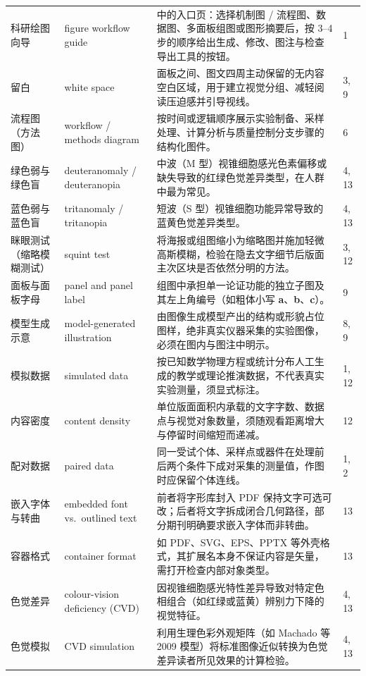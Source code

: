 \begin{longtable}{@{}p{26mm}p{32mm}p{54mm}p{8mm}@{}}
科研绘图向导 & figure workflow guide & \scidraw{} 中的入口页：选择机制图 / 流程图、数据图、多面板组图或图形摘要后，按 3–4 步的顺序给出生成、修改、图注与检查导出工具的按钮。 & 1 \\
留白 & white space & 面板之间、图文四周主动保留的无内容空白区域，用于建立视觉分组、减轻阅读压迫感并引导视线。 & 3, 9 \\
流程图（方法图） & workflow / methods diagram & 按时间或逻辑顺序展示实验制备、采样处理、计算分析与质量控制分支步骤的结构化图件。 & 6 \\
绿色弱与绿色盲 & deuteranomaly / deuteranopia & 中波（M 型）视锥细胞感光色素偏移或缺失导致的红绿色觉差异类型，在人群中最为常见。 & 4, 13 \\
蓝色弱与蓝色盲 & tritanomaly / tritanopia & 短波（S 型）视锥细胞功能异常导致的蓝黄色觉差异类型。 & 4, 13 \\
眯眼测试（缩略模糊测试） & squint test & 将海报或组图缩小为缩略图并施加轻微高斯模糊，检验在隐去文字细节后版面主次区块是否依然分明的方法。 & 3, 12 \\
面板与面板字母 & panel and panel label & 组图中承担单一论证功能的独立子图及其左上角编号（如粗体小写 \textbf{a}、\textbf{b}、\textbf{c}）。 & 9 \\
模型生成示意 & model-generated illustration & 由图像生成模型产出的结构或形貌占位图样，绝非真实仪器采集的实验图像，必须在图内与图注中明示。 & 8, 9 \\
模拟数据 & simulated data & 按已知数学物理方程或统计分布人工生成的教学或理论推演数据，不代表真实实验测量，须显式标注。 & 1, 12 \\
内容密度 & content density & 单位版面面积内承载的文字字数、数据点与视觉对象数量，须随观看距离增大与停留时间缩短而递减。 & 12 \\
配对数据 & paired data & 同一受试个体、采样点或器件在处理前后两个条件下成对采集的测量值，作图时应保留个体连线。 & 1, 2 \\
嵌入字体与转曲 & embedded font vs.\ outlined text & 前者将字形库封入 PDF 保持文字可选可改；后者将文字拆成闭合几何路径，部分期刊明确要求嵌入字体而非转曲。 & 13 \\
容器格式 & container format & 如 PDF、SVG、EPS、PPTX 等外壳格式，其扩展名本身不保证内容是矢量，需打开检查内部对象类型。 & 13 \\
色觉差异 & colour-vision deficiency (CVD) & 因视锥细胞感光特性差异导致对特定色相组合（如红绿或蓝黄）辨别力下降的视觉特征。 & 4, 13 \\
色觉模拟 & CVD simulation & 利用生理色彩外观矩阵（如 Machado 等 2009 模型）将标准图像近似转换为色觉差异读者所见效果的计算检验。 & 4, 13 \\

\end{longtable}
